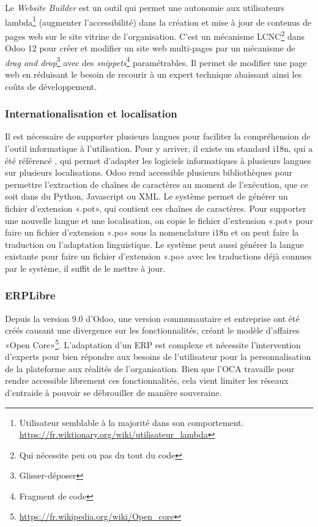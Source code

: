 Le \textit{Website Builder} est un outil qui permet une autonomie aux utilisateurs lambda\footnote{Utilisateur semblable à la majorité dans son comportement. \url{https://fr.wiktionary.org/wiki/utilisateur_lambda}} (augmenter l'accessibilité) dans la création et mise à jour de contenus de pages web sur le site vitrine de l'organisation. C’est un mécanisme LCNC\footnote{Qui nécessite peu ou pas du tout du code} dans Odoo 12 pour créer et modifier un site web multi-pages par un mécanisme de \textit{drag and drop}\footnote{Glisser-déposer} avec des \textit{snippets}\footnote{Fragment de code} paramétrables. Il permet de modifier une page web en réduisant le besoin de recourir à un expert technique abaissant ainsi les coûts de développement.

\subsubsection{Internationalisation et localisation}

Il est nécessaire de supporter plusieurs langues pour faciliter la compréhension de l'outil informatique à l'utilisation. Pour y arriver, il existe un standard i18n, qui a été référencé \cite{i18n_wiley}, qui permet d'adapter les logiciels informatiques à plusieurs langues sur plusieurs localisations\cite{wikipedia_i18n}. Odoo rend accessible plusieurs bibliothèques pour permettre l’extraction de chaînes de caractères au moment de l’exécution, que ce soit dans du Python, Javascript ou XML. Le système permet de générer un fichier d'extension «.pot», qui contient ces chaînes de caractères. Pour supporter une nouvelle langue et une localisation, on copie le fichier d'extension «.pot» pour faire un fichier d'extension «.po» sous la nomenclature i18n et on peut faire la traduction ou l’adaptation linguistique. Le système peut aussi générer la langue existante pour faire un fichier d'extension «.po» avec les traductions déjà connues par le système, il suffit de le mettre à jour.

\subsubsection{ERPLibre}

Depuis la version 9.0 d'Odoo, une version communautaire et entreprise ont été créés causant une divergence sur les fonctionnalités, créant le modèle d'affaires «Open Core»\footnote{\url{https://fr.wikipedia.org/wiki/Open_core}}. L'adaptation d'un ERP est complexe et nécessite l'intervention d'experts pour bien répondre aux besoins de l'utilisateur pour la personnalisation de la plateforme aux réalités de l'organisation. Bien que l'OCA travaille pour rendre accessible librement ces fonctionnalités, cela vient limiter les réseaux d'entraide à pouvoir se débrouiller de manière souveraine.

